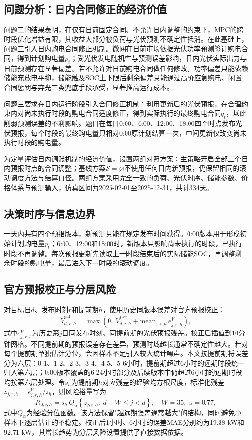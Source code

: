 \subsection{问题分析：日内合同修正的经济价值}
问题二的结果表明，在仅有日前固定合同、不允许日内调整的约束下，MPC的跨时段优化增益有限，其收益大部分被负荷与光伏预测不确定性抵消。在此基础上，问题三引入日内购电合同修正机制。微网在日前市场依据光伏功率预测签订购电合同，得到计划购电量$p_t$；受光伏发电随机性与预测误差影响，日内光伏实际出力与日前预测存在显著偏差。若不允许对日前购电合同做任何修改，功率偏差只能依赖储能充放电平抑，储能触及SOC上下限后剩余偏差只能通过高价应急购电、闲置合同惩罚与弃光三类兜底手段承受，显著推高运行成本。

问题三要求在日内运行阶段引入合同修正机制：利用更新后的光伏预报，在合理约束内对尚未执行时段的购电合同适度修正，得到实际执行的最终购电合同$q_t$，以此削弱预测误差的不利影响。题目在每日0:00、6:00、12:00、18:00四个时点发布光伏预报，每个时段的最终购电量只相对0:00原计划结算一次，中间更新仅改变尚未执行时段的购电量。

为定量评估日内调账机制的经济价值，设置两组对照方案：主策略开启全部三个日内预报时点的合同调整；基线方案$\mathcal{S}=\varnothing$不使用任何日内新预报，仍保留相同的滚动调度方法与结算口径。两组方案采用完全一致的负荷、光伏时序、储能参数、价格体系与预测输入，仿真区间为2025-02-01至2025-12-31，共计334天。

\subsection{决策时序与信息边界}
一天内共有四个预报版本，新预测只能在规定发布时间获得。0:00版本用于形成初始计划购电量$p_t$；6:00、12:00和18:00时，新版本只影响尚未执行的时段，已执行时段不再调整。每次预报更新先读取上一时段结束后的实际储能SOC，再调整剩余时段的购电量，最后进入下一时段的滚动调度。

\subsection{官方预报校正与分层风险}
对目标日$d$、发布时刻$r$和提前期$h$，使用历史同版本误差对官方预报校正：
\begin{equation}
\hat{V}_{d,r,h}^{\mathrm{cal}}=\max\left(0,\ \hat{V}_{d,r,h}^{\mathrm{raw}}+\mathrm{mean}_{j<d}\,e_{j,r,h}^{V}\right),
\label{eq:q3_cal}
\end{equation}
式中$e_{j,r,h}^{V}$为历史第$j$日同发布时刻、同提前期的光伏预报残差。校正后插值到10分钟网格。不同提前期的预报误差存在差异，预测时域越长通常不确定性越大。若对每个提前期单独估计分位，会因样本不足引入较大统计噪声。本文按提前期将误差分为六层：0-1、1-2、2-3、3-4、4-5、5-6小时，提前期超过6小时的远期时段统一归入第六层；0:00版本覆盖的6-24小时部分及后续版本中仍超过6小时的远期时段均按第六层处理。令$s_h$为提前期$h$对应残差的经验均方根尺度，标准化残差$z_{j,r,h}=e_{j,r,h}^{V}/s_h$，则风险裕量写为
\begin{equation}
R_{d,r,h}=s_h\,Q_\alpha\left\{z_{j,r,h}:\ d-W\le j<d\right\},\quad W=35,\ \alpha=0.77,
\label{eq:q3_risk}
\end{equation}
式中$Q_\alpha$为经验分位函数。该方法保留"越远期误差通常越大"的结构，同时避免小样本下逐层估计的不稳定。校正后1小时、6小时的误差MAE分别约为19.38 kW和92.71 kW，其增长趋势为分层风险设置提供了直接数据依据。

